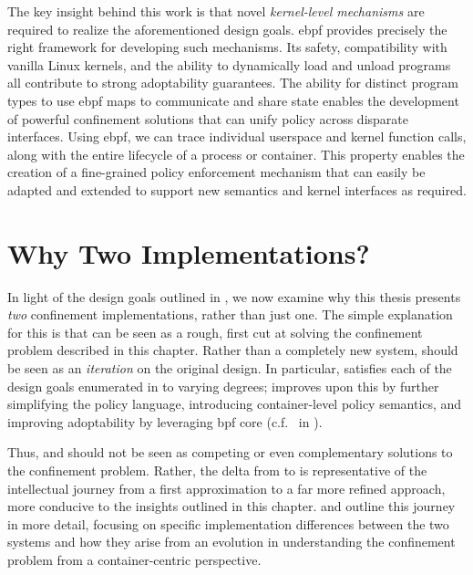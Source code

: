 The key insight behind this work is that novel \textit{kernel-level mechanisms} are
required to realize the aforementioned design goals. \gls{ebpf} provides precisely the
right framework for developing such mechanisms. Its safety, compatibility with vanilla
Linux kernels, and the ability to dynamically load and unload programs all contribute to
strong adoptability guarantees. The ability for distinct program types to use \gls{ebpf}
maps to communicate and share state enables the development of powerful confinement
solutions that can unify policy across disparate interfaces. Using \gls{ebpf}, we can
trace individual userspace and kernel function calls, along with the entire lifecycle of
a process or container. This property enables the creation of a fine-grained policy
enforcement mechanism that can easily be adapted and extended to support new semantics and
kernel interfaces as required.



\section{Why Two Implementations?}
\label{s:cp-why-two}

In light of the design goals outlined in , we now examine why this
thesis presents \textit{two} confinement implementations, rather than just one. The simple
explanation for this is that \bpfbox{} can be seen as a rough, first cut at solving the
confinement problem described in this chapter. Rather than a completely new system,
\bpfcontain{} should be seen as an \textit{iteration} on the original \bpfbox{} design.
In particular, \bpfbox{} satisfies each of the design goals enumerated in
 to varying degrees; \bpfcontain{} improves upon this by further
simplifying the policy language, introducing container-level policy semantics, and
improving adoptability by leveraging \gls{bpf} \gls{core} (c.f.~ in
).

Thus, \bpfbox{} and \bpfcontain{} should not be seen as competing or even complementary
solutions to the confinement problem. Rather, the delta from \bpfbox{} to \bpfcontain{} is
representative of the intellectual journey from a first approximation to a far more
refined approach, more conducive to the insights outlined in this chapter. 
and  outline this journey in more detail, focusing on specific implementation
differences between the two systems and how they arise from an evolution in understanding
the confinement problem from a container-centric perspective.



